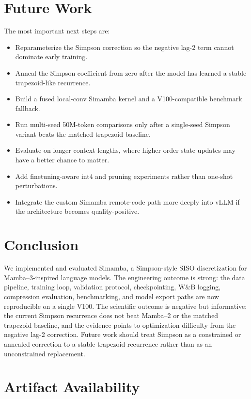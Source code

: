 \documentclass[conference]{IEEEtran}
\newcommand{\modelname}{Simamba\xspace}
\newcommand{\mambatwo}{Mamba--2\xspace}
\newcommand{\mambathree}{Mamba--3\xspace}
\begin{document}
\section{Future Work}

The most important next steps are:
\begin{itemize}
    \item Reparameterize the Simpson correction so the negative lag-2 term cannot dominate early training.
    \item Anneal the Simpson coefficient from zero after the model has learned a stable trapezoid-like recurrence.
    \item Build a fused local-conv \modelname kernel and a V100-compatible benchmark fallback.
    \item Run multi-seed 50M-token comparisons only after a single-seed Simpson variant beats the matched trapezoid baseline.
    \item Evaluate on longer context lengths, where higher-order state updates may have a better chance to matter.
    \item Add finetuning-aware int4 and pruning experiments rather than one-shot perturbations.
    \item Integrate the custom \modelname remote-code path more deeply into vLLM if the architecture becomes quality-positive.
\end{itemize}

\section{Conclusion}

We implemented and evaluated \modelname, a Simpson-style SISO discretization for \mambathree-inspired language models. The engineering outcome is strong: the data pipeline, training loop, validation protocol, checkpointing, W\&B logging, compression evaluation, benchmarking, and model export paths are now reproducible on a single V100. The scientific outcome is negative but informative: the current Simpson recurrence does not beat \mambatwo or the matched trapezoid baseline, and the evidence points to optimization difficulty from the negative lag-2 correction. Future work should treat Simpson as a constrained or annealed correction to a stable trapezoid recurrence rather than as an unconstrained replacement.

\section*{Artifact Availability}
\end{document}
